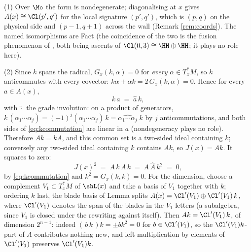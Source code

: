 (1) Over $\Mo$ the form is nondegenerate; diagonalising at $x$ gives $A(x) \cong \Cl(p', q')$ for the local signature $(p', q')$, which is $(p,q)$ on the physical side and $(p{-}1, q{+}1)$ across the wall (Remark \ref{rem:coords}). The named isomorphisms are Fact  (the coincidence of the two is the fusion phenomenon of \cite[Ex.~5.10]{ButlerT1}, both being ascents of $\Cl(0,3) \cong \HH \oplus \HH$; it plays no role here).

(2) Since $k$ spans the radical, $G_x(k, \alpha) = 0$ for \emph{every} $\alpha \in T^*_xM$, so $k$ anticommutes with every covector: $k\alpha + \alpha k = 2\,G_x(k,\alpha) = 0$. Hence for every $a \in A(x)$,
\begin{equation}\label{eq:kcommutation}
k\,a \;=\; \hat{a}\,k ,
\end{equation}
with $\hat{\cdot}$ the grade involution: on a product of generators, $k\,(\alpha_1 \cdots \alpha_j) = (-1)^j (\alpha_1 \cdots \alpha_j)\, k = \widehat{\alpha_1 \cdots \alpha_j}\; k$ by $j$ anticommutations, and both sides of \eqref{eq:kcommutation} are linear in $a$ (nondegeneracy plays no role). Therefore $A k = k A$, and this common set is a two-sided ideal containing $k$; conversely any two-sided ideal containing $k$ contains $Ak$, so $J(x) = Ak$. It squares to zero:
\[
J(x)^2 \;=\; A\,k\,A\,k \;=\; A\,\hat{A}\,k^2 \;=\; 0 ,
\]
by \eqref{eq:kcommutation} and $k^2 = G_x(k,k) = 0$. For the dimension, choose a complement $V_1 \subset T^*_xM$ of $\shL(x)$ and take a basis of $V_1$ together with $k$; ordering $k$ last, the blade basis of Lemma  splits $A(x) = \Cl'(V_1) \oplus \Cl'(V_1)\,k$, where $\Cl'(V_1)$ denotes the span of the blades in the $V_1$-letters (a subalgebra, since $V_1$ is closed under the rewriting against itself). Then $Ak = \Cl'(V_1)\,k$, of dimension $2^{n-1}$: indeed $(\,b\,k\,)k = \pm b k^2 = 0$ for $b \in \Cl'(V_1)$, so the $\Cl'(V_1)k$-part of $A$ contributes nothing new, and left multiplication by elements of $\Cl'(V_1)$ preserves $\Cl'(V_1)k$.

